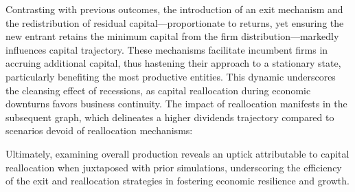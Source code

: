 \documentclass[12pt]{report}
\begin{document}

Contrasting with previous outcomes, the introduction of an exit mechanism and the redistribution of residual
capital—proportionate to returns, yet ensuring the new entrant retains the minimum capital from the firm
distribution—markedly influences capital trajectory. These mechanisms facilitate incumbent firms in accruing additional
capital, thus hastening their approach to a stationary state, particularly benefiting the most productive entities. This
dynamic underscores the cleansing effect of recessions, as capital reallocation during economic downturns favors
business continuity. The impact of reallocation manifests in the subsequent graph, which delineates a higher
dividends trajectory compared to scenarios devoid of reallocation mechanisms: 


Ultimately, examining overall production reveals an uptick attributable to capital reallocation when juxtaposed with
prior simulations, underscoring the efficiency of the exit and reallocation strategies in fostering economic resilience
and growth.


    
\end{document}
